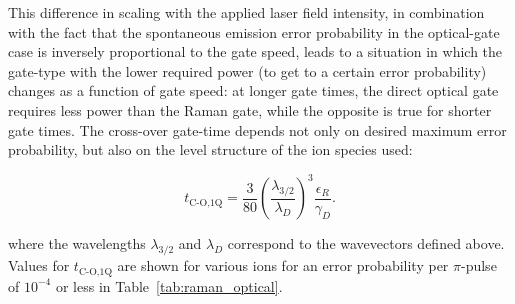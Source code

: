 \documentclass[%
reprint,
 amsmath,amssymb,
]{revtex4-1}
\begin{document}
This difference in scaling with the applied laser field intensity, in combination with the fact that the spontaneous emission error probability in the optical-gate case is inversely proportional to the gate speed, leads to a situation in which the gate-type with the lower required power (to get to a certain error probability) changes as a function of gate speed:  at longer gate times, the direct optical gate requires less power than the Raman gate, while the opposite is true for shorter gate times.  The cross-over gate-time depends not only on desired maximum error probability, but also on the level structure of the ion species used:

\begin{equation}
t_{\textrm{C-O,1Q}}=\frac{3}{80}\left( \frac{\lambda_{3/2}}{\lambda_{D}} \right)^{3} \frac{\epsilon_{R}}{\gamma_{D}}.
\end{equation}

\noindent where the wavelengths $\lambda_{3/2}$ and $\lambda_{D}$ correspond to the wavevectors defined above.  Values for $t_{\textrm{C-O,1Q}}$ are shown for various ions for an error probability per $\pi$-pulse of $10^{-4}$ or less in Table~\ref{tab:raman_optical}.

\end{document}
